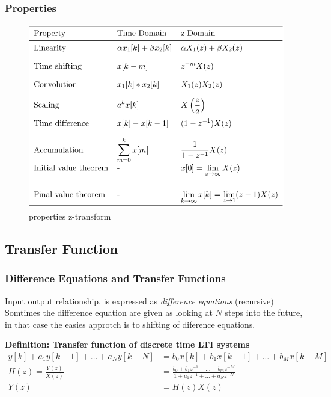 \newpage
\subsubsection{Properties}
\begin{figure}[!h]
    \centering
    \includegraphics[width=12cm]{image/properties_z-transform.png}
    \caption{properties z-transform}
    \label{fig:properties_z-transform}
\end{figure}


\subsection{Transfer Function}
\subsubsection{Difference Equations and Transfer Functions}
Input output relationship, is expressed as \textit{difference equations} (recursive)
Somtimes the difference equation are given as looking at $N$ steps into 
the future, in that case the easies approtch is to shifting of diference equations.

\textbf{Definition: Transfer function of discrete time LTI systems}
\begin{align*}
    y[k]+a_1y[k-1]+\ldots+a_N y[k-N] &= b_0 x[k]+b_1 x[k-1]+\ldots+b_M x[k-M] \\ 
    H(z) = \frac{Y(z)}{X(z)} &= \frac{b_0+b_1z^{-1}+\ldots+b_mz^{-M}}{1+a_1z^{-1}+\ldots+a_Nz^{-N}} \\
    Y(z) &= H(z)X(z)
\end{align*}


